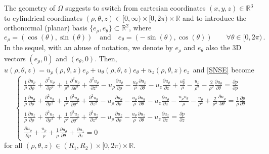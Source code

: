 \documentclass[a4paper,11pt]{amsart}
\numberwithin{equation}{section}
\numberwithin{figure}{section}
\newcommand{\R}{\mathbb{R}}
\begin{document}
	
	The geometry of $\Omega$ suggests to switch from cartesian coordinates $(x,y,z)\in\R^3$ to cylindrical coordinates
	$(\rho,\theta,z)\in [0,\infty) \times [0,2\pi)\times\R$ and to introduce the orthonormal (planar) basis $\lbrace e_\rho, e_\theta \rbrace \subset \mathbb{R}^{2}$, where
	$$
	e_\rho=(\cos(\theta),\sin(\theta)) \quad \text{and} \quad e_\theta=(-\sin(\theta),\cos(\theta)) \qquad \forall \theta \in [0,2\pi)\, .
	$$
	In the sequel, with an abuse of notation, we denote by $e_\rho$ and $e_\theta$ also the 3D vectors $(e_\rho,0)$ and $(e_\theta,0)$. Then,
	$u(\rho,\theta,z)=u_\rho(\rho,\theta,z)e_\rho+u_\theta(\rho,\theta,z)e_\theta+u_z(\rho,\theta,z)e_z\,
	$
	and \eqref{SNSE} become
	\begin{equation}\label{SNSEcyl}
		\left\{\begin{array}{l}
			\frac{1}{\rho}\frac{\partial u_\rho}{\partial\rho}+\frac{\partial^2 u_\rho}{\partial\rho^2}+\frac{1}{\rho^2}\frac{\partial^2 u_\rho}{\partial\theta^2}+\frac{\partial^2 u_\rho}{\partial z^2}
			-u_\rho\frac{\partial u_\rho}{\partial\rho}-\frac{u_\theta}{\rho}\frac{\partial u_\rho}{\partial\theta}-u_z\frac{\partial u_\rho}{\partial z}
			+\frac{u_\theta^2}{\rho}-\frac{u_\rho}{\rho^2}-\frac{2}{\rho^2}\frac{\partial u_\theta}{\partial\theta}=\frac{\partial p}{\partial\rho}\\[5pt]
			\frac{1}{\rho}\frac{\partial u_\theta}{\partial\rho}+\frac{\partial^2 u_\theta}{\partial\rho^2}
			+\frac{1}{\rho^2}\frac{\partial^2 u_\theta}{\partial\theta^2}+\frac{\partial^2 u_\theta}{\partial z^2}-u_\rho\frac{\partial u_\theta}{\partial\rho}-\frac{u_\theta}{\rho}\frac{\partial u_\theta}{\partial\theta}
			-u_z\frac{\partial u_\theta}{\partial z}-\frac{u_\rho u_\theta}{\rho}-\frac{u_\theta}{\rho^2}+\frac{2}{\rho^2}\frac{\partial u_\rho}{\partial\theta}
			=\frac{1}{\rho}\frac{\partial p}{\partial\theta}\\[5pt]
			\frac{1}{\rho}\frac{\partial u_z}{\partial\rho}+\frac{\partial^2 u_z}{\partial\rho^2}+\frac{1}{\rho^2}\frac{\partial^2 u_z}{\partial\theta^2}+\frac{\partial^2 u_z}{\partial z^2}
			-u_\rho\frac{\partial u_z}{\partial\rho}-\frac{u_\theta}{\rho}\frac{\partial u_z}{\partial\theta}-u_z\frac{\partial u_z}{\partial z}=\frac{\partial p}{\partial z}\\[5pt]
			\frac{\partial u_\rho}{\partial\rho}+\frac{u_\rho}{\rho}+\frac{1}{\rho}\frac{\partial u_\theta}{\partial\theta}
			+\frac{\partial u_z}{\partial z}=0
		\end{array}\right.
	\end{equation}
	for all $(\rho,\theta,z)\in(R_1,R_2)\times[0,2\pi)\times\R$.
\end{document}
